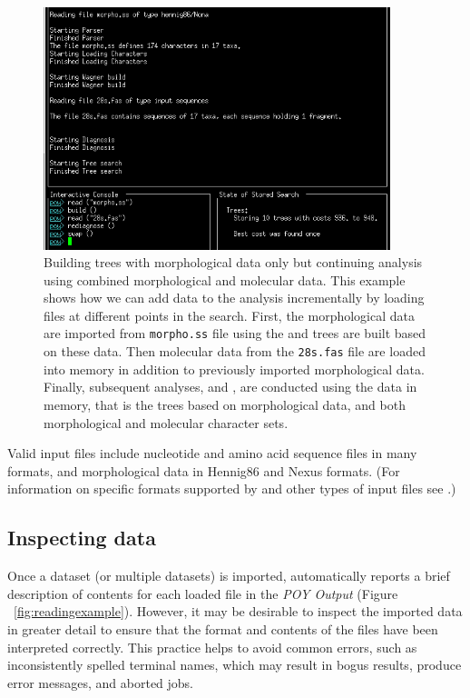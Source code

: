 {\begin{figure}[]
    \begin{center}
        \includegraphics[width=0.9\textwidth]{doc/figures/reading_example2.jpg}
    \end{center}
    \caption{Building trees with morphological data only but continuing analysis using combined morphological and molecular data. This example shows how we can add data to the analysis incrementally by loading files at different points in the search. First, the morphological data are imported from \texttt{morpho.ss} file using  the and trees are built based on these data. Then molecular data from the \texttt{28s.fas} file are loaded into memory in addition to previously imported morphological data. Finally, subsequent analyses,  and , are conducted using the data in memory, that is the trees based on morphological data, and both morphological and molecular character sets.}
    \label{fig:reading_example2}
\end{figure}

Valid input files include nucleotide and amino acid sequence files in many formats,
and morphological data in Hennig86 and Nexus formats. (For information on specific formats supported by \poy and other types of input files see .)

\subsection{Inspecting data}

Once a dataset (or multiple datasets) is imported, \poy automatically reports a brief description of contents for each loaded file in the \emph{POY Output} (Figure ~\ref{fig:readingexample}). However, it may be desirable to inspect the imported data in greater detail to ensure that the format and contents of the files have been interpreted correctly. This practice helps to avoid common errors, such as inconsistently spelled terminal names, which may result in bogus results, produce error messages, and aborted jobs.

}
